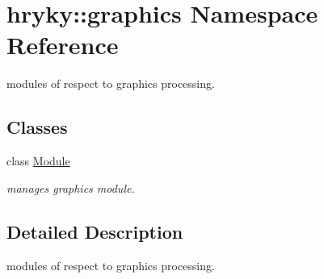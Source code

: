 \hypertarget{namespacehryky_1_1graphics}{\section{hryky\-:\-:graphics Namespace Reference}
\label{namespacehryky_1_1graphics}
}


modules of respect to graphics processing.  


\subsection*{Classes}
\begin{DoxyCompactItemize}
\item 
class \hyperlink{classhryky_1_1graphics_1_1_module}{Module}
\begin{DoxyCompactList}\small\item\em manages graphics module. \end{DoxyCompactList}\end{DoxyCompactItemize}


\subsection{Detailed Description}
modules of respect to graphics processing. 